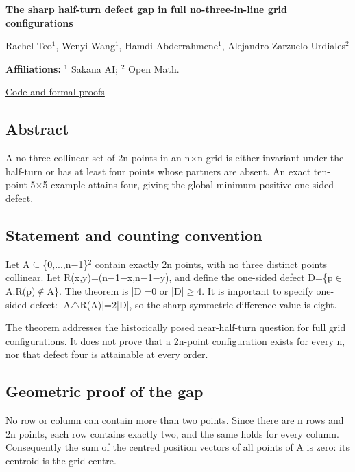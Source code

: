 \documentclass[11pt,a4paper]{article}
\begin{document}
{\LARGE\bfseries The sharp half-turn defect gap in full no-three-in-line grid configurations\par}\medskip
{\small Rachel Teo\ensuremath{^1}, Wenyi Wang\ensuremath{^1}, Hamdi Abderrahmene\ensuremath{^1}, Alejandro Zarzuelo Urdiales\ensuremath{^2}\par}\medskip
{\small\textbf{Affiliations:} \href{https://sakana.ai/}{\ensuremath{^1} Sakana AI}; \href{https://rsihouse.ai/openmath}{\ensuremath{^2} Open Math}.\par}

{\small\href{https://github.com/alejandrozu/openmath-2026-judging}{Code and formal proofs}\par}

\subsection{Abstract}
A no-three-collinear set of 2n points in an n\ensuremath{\times}n grid is either invariant under the half-turn or has at least four points whose partners are absent. An exact ten-point 5\ensuremath{\times}5 example attains four, giving the global minimum positive one-sided defect.

\subsection{Statement and counting convention}
Let A\ensuremath{\subseteq}\{0,...,n\ensuremath{-}1\}\ensuremath{^2} contain exactly 2n points, with no three distinct points collinear. Let R(x,y)=(n\ensuremath{-}1\ensuremath{-}x,n\ensuremath{-}1\ensuremath{-}y), and define the one-sided defect D=\{p\ensuremath{\in}A:R(p)\ensuremath{\notin}A\}. The theorem is |D|=0 or |D|\ensuremath{\geq}4. It is important to specify one-sided defect: |A\ensuremath{\triangle}R(A)|=2|D|, so the sharp symmetric-difference value is eight.

The theorem addresses the historically posed near-half-turn question for full grid configurations. It does not prove that a 2n-point configuration exists for every n, nor that defect four is attainable at every order.

\subsection{Geometric proof of the gap}
No row or column can contain more than two points. Since there are n rows and 2n points, each row contains exactly two, and the same holds for every column. Consequently the sum of the centred position vectors of all points of A is zero: its centroid is the grid centre.
\end{document}
